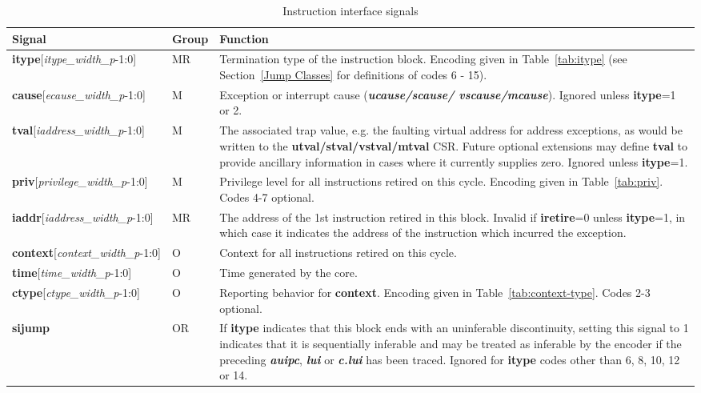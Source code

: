 \begin{table}[htp]
    \centering
    \caption{Instruction interface signals}
    \label{tab:common-ingress}
    \begin{tabulary}{\textwidth}{|l|l|p{80mm}|}
        \hline
        \textbf{Signal} & \textbf{Group} & \textbf{Function} \\
        \hline
        \textbf{itype}[\textit{itype\_width\_p}-1:0] & MR & Termination type of the instruction block.  Encoding given in Table~\ref{tab:itype}
         (see Section~\ref{Jump Classes} for definitions of codes 6 - 15).\\
        \hline
        \textbf{cause}[\textit{ecause\_width\_p}-1:0] & M & Exception or interrupt cause (\textbf{\textit{ucause/scause/ vscause/mcause}}).
        Ignored unless \textbf {itype}=1 or 2.\\
        \hline
        \textbf{tval}[\textit{iaddress\_width\_p}-1:0] & M & The associated trap value, e.g. the
        faulting virtual address for address exceptions, as would be
        written to the \textbf{utval/stval/vstval/mtval} CSR. Future optional extensions may define \textbf{tval} 
        to provide ancillary information in cases where it currently supplies zero.
        Ignored unless \textbf{itype}=1.\\
        \hline
        \textbf{priv}[\textit{privilege\_width\_p}-1:0] & M & Privilege level for all instructions retired on this cycle.
        Encoding given in Table~\ref{tab:priv}.  Codes 4-7 optional.\\
        \hline
        \textbf{iaddr}[\textit{iaddress\_width\_p}-1:0] & MR & The address of the 1st instruction retired in this block.
        Invalid if \textbf{iretire}=0 unless \textbf{itype}=1, in which case it indicates the address of the 
        instruction which incurred the exception. \\
        \hline
        \textbf{context}[\textit{context\_width\_p}-1:0] & O & Context for all instructions retired on this cycle.\\
        \hline
        \textbf{time}[\textit{time\_width\_p}-1:0] & O & Time generated by the core.\\
        \hline
        \textbf{ctype}[\textit{ctype\_width\_p}-1:0] & O & Reporting behavior for \textbf{context}.  
        Encoding given in Table~\ref{tab:context-type}.  Codes 2-3 optional.\\
        \hline
        \textbf{sijump} & OR & If \textbf{itype} indicates that this block ends with an uninferable discontinuity, setting this signal to 1 
        indicates that it is sequentially inferable and may be treated as inferable by the encoder if the preceding 
        \textbf{\textit{auipc}}, \textbf{\textit{lui}} or \textbf{\textit{c.lui}} has been traced.  
        Ignored for \textbf{itype} codes other than 6, 8, 10, 12 or 14.\\
        \hline
    \end{tabulary}
\end{table}

